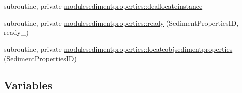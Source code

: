 \begin{DoxyCompactItemize}
\item 
subroutine, private \mbox{\hyperlink{namespacemodulesedimentproperties_a2d719466ca9047ba28957d7df363ad7b}{modulesedimentproperties\+::deallocateinstance}}
\item 
subroutine, private \mbox{\hyperlink{namespacemodulesedimentproperties_a0ac80b6b6970285688cd69f623317e33}{modulesedimentproperties\+::ready}} (Sediment\+Properties\+ID, ready\+\_\+)
\item 
subroutine, private \mbox{\hyperlink{namespacemodulesedimentproperties_a8bdf617b0165523af238758f5b5a5767}{modulesedimentproperties\+::locateobjsedimentproperties}} (Sediment\+Properties\+ID)
\end{DoxyCompactItemize}
\subsection*{Variables}
